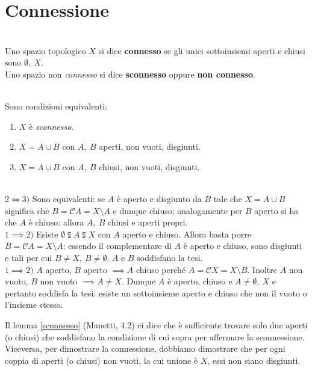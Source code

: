 \section{Connessione}
\begin{define}~{}\\
Uno spazio topologico $X$ si dice \textbf{connesso} se gli unici sottoinsiemi aperti e chiusi sono $\emptyset,\ X$.\\
Uno spazio non \textit{connesso} si dice \textbf{sconnesso} oppure \textbf{non connesso}.
\end{define}
\begin{lemming}~{}\label{sconnesso}\\
Sono condizioni equivalenti:
\begin{enumerate}
	\item $X$ è \textit{sconnesso}.
	\item $X=A\cup B$ con $A,\ B$ aperti, non vuoti, disgiunti.
	\item $X=A\cup B$ con $A,\ B$ chiusi, non vuoti, disgiunti.
\end{enumerate}
\vspace{-3mm}
\end{lemming}
\begin{demonstration}~{}\\
$2\iff3)$ Sono equivalenti: se $A$ è aperto e disgiunto da $B$ tale che $X=A\cup B$ significa che $B=\mathcal{C}A=X\setminus A$ e dunque chiuso; analogamente per $B$ aperto si ha che $A$ è chiuso: allora $A,\ B$ chiusi e aperti propri.\\
$1\implies2)$ Esiste $\emptyset\subsetneqq A \subsetneqq X$ con $A$ aperto e chiuso. Allora basta porre $B=\mathcal{C}A=X\setminus A$: essendo il complementare di $A$ è aperto e chiuso, sono disgiunti e tali per cui $B\neq X,\ B\neq \emptyset$. $A$ e $B$ soddisfano la tesi.\\
$1\implies2)$ $A$ aperto, $B$ aperto $\implies A$ chiuso perché $A=\mathcal{C}X=X\setminus B$. Inoltre $A$ non vuoto, $B$ non vuoto $\implies A\neq X$. Dunque $A$ è aperto, chiuso e $A\neq \emptyset,\ X$ e pertanto soddisfa la tesi: esiste un sottoinsieme aperto e chiuso che non il vuoto o l'insieme stesso.
\end{demonstration}
\begin{tips}
	Il lemma \ref{sconnesso} (Manetti, 4.2) ci dice che è sufficiente trovare solo due aperti (o chiusi) che soddisfano la condizione di cui sopra per affermare la sconnessione. Viceversa, per dimostrare la connessione, dobbiamo dimostrare che per ogni coppia di aperti (o chiusi) non vuoti, la cui unione è $X$, essi non siano disgiunti.
\end{tips}
